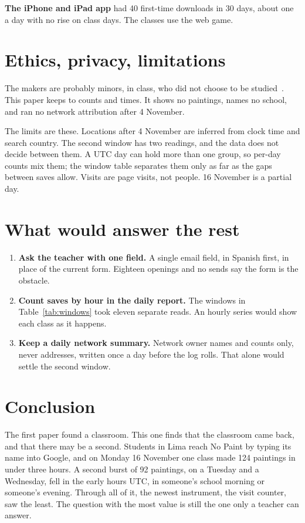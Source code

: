\documentclass[10pt,letterpaper,twocolumn]{article}
\begin{document}
\textbf{The iPhone and iPad app} had 40 first-time downloads in 30 days, about one a day with no rise on class days. The classes use the web game.

\section{Ethics, privacy, limitations}

The makers are probably minors, in class, who did not choose to be studied~\cite{livingstone2019children}. This paper keeps to counts and times. It shows no paintings, names no school, and ran no network attribution after 4 November.

The limits are these. Locations after 4 November are inferred from clock time and search country. The second window has two readings, and the data does not decide between them. A UTC day can hold more than one group, so per-day counts mix them; the window table separates them only as far as the gaps between saves allow. Visits are page visits, not people. 16 November is a partial day.

\section{What would answer the rest}

\begin{enumerate}
\item \textbf{Ask the teacher with one field.} A single email field, in Spanish first, in place of the current form. Eighteen openings and no sends say the form is the obstacle.
\item \textbf{Count saves by hour in the daily report.} The windows in Table~\ref{tab:windows} took eleven separate reads. An hourly series would show each class as it happens.
\item \textbf{Keep a daily network summary.} Network owner names and counts only, never addresses, written once a day before the log rolls. That alone would settle the second window.
\end{enumerate}

\section{Conclusion}

The first paper found a classroom. This one finds that the classroom came back, and that there may be a second. Students in Lima reach No Paint by typing its name into Google, and on Monday 16 November one class made 124 paintings in under three hours. A second burst of 92 paintings, on a Tuesday and a Wednesday, fell in the early hours UTC, in someone's school morning or someone's evening. Through all of it, the newest instrument, the visit counter, saw the least. The question with the most value is still the one only a teacher can answer.
\end{document}
